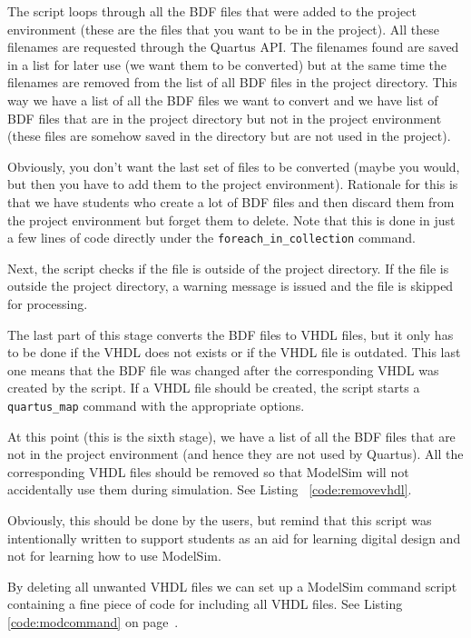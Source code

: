 \documentclass[11pt,a4paper,final,oneside,titlepage,fleqn]{article}
\begin{document}
The script loops through all the BDF files that were added to the project
environment (these are the files that you want to be in the project). All
these filenames are requested through the Quartus API. The filenames found
are saved in a list for later use (we want them to be converted) but at the
same time the filenames are removed from the list of all BDF files in the project
directory. This way we have a list of all the BDF files we want to convert
and we have list of BDF files that are in the project directory but not in
the project environment (these files are somehow saved in the directory but
are not used in the project).



Obviously, you don't want the last set of files
to be converted (maybe you would, but then you have to add them to the project
environment). Rationale for this is that we have students who create a lot
of BDF files and then discard them from the project environment but forget
them to delete. Note that this is done in just a few lines of code directly
under the \texttt{foreach\_in\_collection} command.

Next, the script checks if the file is outside of the project directory. If
the file is outside the project directory, a warning message is issued and the
file is skipped for processing.

The last part of this stage converts the BDF files to VHDL files, but it
only has to be done if the VHDL does not exists or if the VHDL file is
outdated. This last one means that the BDF file was changed after the
corresponding VHDL was created by the script. If a VHDL file should be
created, the script starts a \texttt{quartus\_map} command with the
appropriate options.

At this point (this is the sixth stage), we have a list of all the BDF files
that are not in the project environment (and hence they are not used by
Quartus). All the corresponding VHDL files should be removed so that ModelSim
will not accidentally use them during simulation. See Listing~%
\ref{code:removevhdl}.

Obviously, this should be done by the users, but remind that this script was
intentionally written to support students as an aid for learning digital design
and not for learning how to use ModelSim.

By deleting all unwanted VHDL files we can set up a ModelSim command script
containing a fine piece of code for including all VHDL files. See Listing~%
\ref{code:modcommand} on page~\pageref{code:modcommand}.
\end{document}
